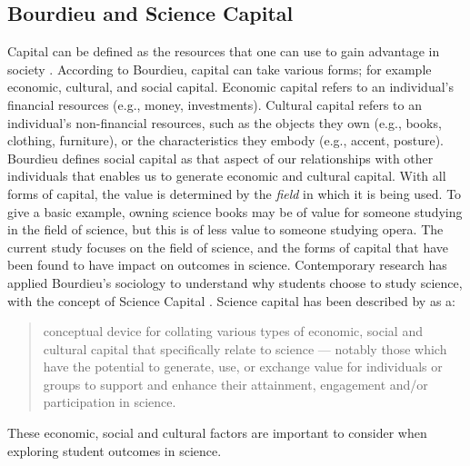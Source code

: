 \subsection*{Bourdieu and Science Capital}
\label{sciencecapital}
Capital can be defined as the resources that one can use to gain advantage in society \cite{Bourdieu_1986}. According to Bourdieu, capital can take various forms; for example economic, cultural, and social capital. Economic capital refers to an individual's financial resources (e.g., money, investments). Cultural capital refers to an individual's non-financial resources, such as the objects they own (e.g., books, clothing, furniture), or the characteristics they embody (e.g., accent, posture). Bourdieu defines social capital as that aspect of our relationships with other individuals that enables us to generate economic and cultural capital. With all forms of capital, the value is determined by the \textit{field} in which it is being used. To give a basic example, owning science books may be of value for someone studying in the field of science, but this is of less value to someone studying opera. The current study focuses on the field of science, and the forms of capital that have been found to have impact on outcomes in science. Contemporary research has applied Bourdieu's sociology to understand why students choose to study science, with the concept of Science Capital \cite{Archer_2015}. Science capital has been described by \cite{Archer2014} as a:
\begin{quote}
conceptual device for collating various types of economic, social and cultural capital that specifically relate to science --- notably those which have the potential to generate, use, or exchange value for individuals or groups to support and enhance their attainment, engagement and/or participation in science.
\end{quote}
These economic, social and cultural factors are important to consider when exploring student outcomes in science. 

